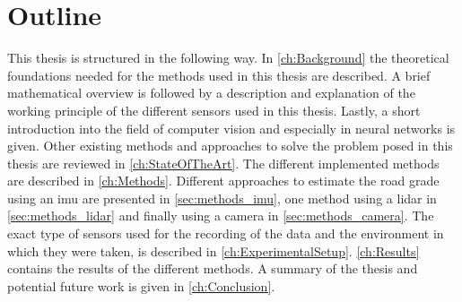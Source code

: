 \section{Outline}
This thesis is structured in the following way.
In \cref{ch:Background} the theoretical foundations needed for the methods used in this thesis are described.
A brief mathematical overview is followed by a description and explanation of the working principle of the different sensors used in this thesis.
Lastly, a short introduction into the field of computer vision and especially in neural networks is given.
Other existing methods and approaches to solve the problem posed in this thesis are reviewed in \cref{ch:StateOfTheArt}.
The different implemented methods are described in \cref{ch:Methods}.
Different approaches to estimate the road grade using an \gls{imu} are presented in \cref{sec:methods_imu}, one method using a \gls{lidar} in \cref{sec:methods_lidar} and finally using a camera in \cref{sec:methods_camera}.
The exact type of sensors used for the recording of the data and the environment in which they were taken, is described in \cref{ch:ExperimentalSetup}.
\cref{ch:Results} contains the results of the different methods.
A summary of the thesis and potential future work is given in \cref{ch:Conclusion}.
